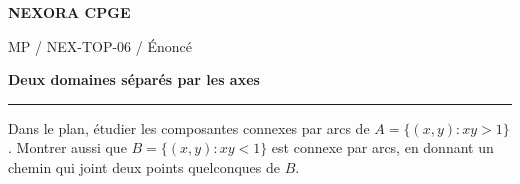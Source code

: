 \documentclass[11pt,a4paper]{article}
\begin{document}
{\small\bfseries\color{nexorablue} NEXORA CPGE}\par
{\small MP / NEX-TOP-06 / Énoncé}\par
{\LARGE\bfseries Deux domaines séparés par les axes}\par
\vspace{0.25em}\hrule\vspace{0.6em}

Dans le plan, étudier les composantes connexes par arcs de $A=\{(x,y):xy>1\}$. Montrer aussi que $B=\{(x,y):xy<1\}$ est connexe par arcs, en donnant un chemin qui joint deux points quelconques de $B$.
\end{document}
